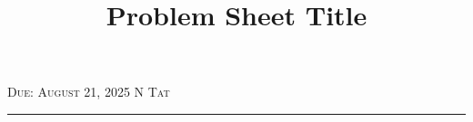 \documentclass[a4paper, 11pt]{article}
\title{Problem Sheet Title}
\author{}
\date{}
\begin{document}
    \maketitle
    \vspace{-5em}
    \textsc{Due: August 21, 2025} \hfill \textsc{N Tat}
    \vspace{5pt}
    \hrule
    


    

    

    

    
\end{document}
